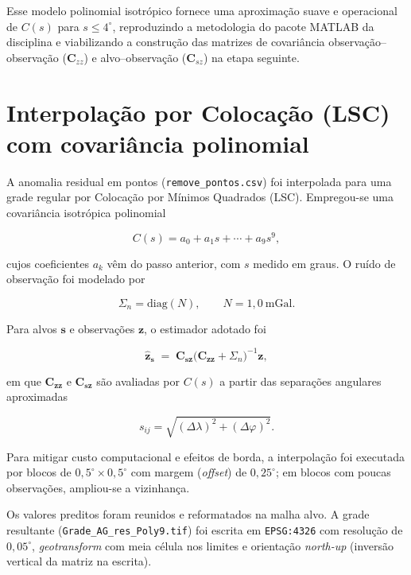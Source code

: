 Esse modelo polinomial isotrópico fornece uma aproximação suave e operacional de $C(s)$ para $s\le 4^\circ$, reproduzindo a metodologia do pacote MATLAB da disciplina e viabilizando a construção das matrizes de covariância observação–observação ($\mathbf{C}_{zz}$) e alvo–observação ($\mathbf{C}_{sz}$) na etapa seguinte.


\section{Interpolação por Colocação (LSC) com covariância polinomial}

A anomalia residual em pontos (\texttt{remove\allowbreak\_pontos.csv}) foi interpolada para uma grade regular por Colocação por Mínimos Quadrados (LSC). Empregou-se uma covariância isotrópica polinomial

\begin{equation}
    C(s)=a_0+a_1 s+\cdots+a_9 s^9,
\end{equation}

\noindent cujos coeficientes $a_k$ vêm do passo anterior, com $s$ medido em graus. O ruído de observação foi modelado por

\begin{equation}
    \Sigma_n=\mathrm{diag}(N),\qquad N=1{,}0~\mathrm{mGal}.
\end{equation}

Para alvos $\mathbf{s}$ e observações $\mathbf{z}$, o estimador adotado foi

\begin{equation}
    \hat{\mathbf{z}}_{\mathbf{s}} \;=\; \mathbf{C}_{\mathbf{s}\mathbf{z}}
    \bigl(\mathbf{C}_{\mathbf{z}\mathbf{z}}+\Sigma_n\bigr)^{-1}\mathbf{z},
\end{equation}

\noindent em que $\mathbf{C}_{\mathbf{z}\mathbf{z}}$ e $\mathbf{C}_{\mathbf{s}\mathbf{z}}$ são avaliadas por $C(s)$ a partir das separações angulares aproximadas

\begin{equation}
    s_{ij}=\sqrt{(\Delta\lambda)^2+(\Delta\varphi)^2}.
\end{equation}

\noindent Para mitigar custo computacional e efeitos de borda, a interpolação foi executada por blocos de $0{,}5^\circ\times 0{,}5^\circ$ com margem (\emph{offset}) de $0{,}25^\circ$; em blocos com poucas observações, ampliou-se a vizinhança.

Os valores preditos foram reunidos e reformatados na malha alvo. A grade resultante (\texttt{Grade\allowbreak\_AG\allowbreak\_res\allowbreak\_Poly9.tif}) foi escrita em \texttt{EPSG:4326} com resolução de $0{,}05^\circ$, \emph{geotransform} com meia célula nos limites e orientação \emph{north-up} (inversão vertical da matriz na escrita).

